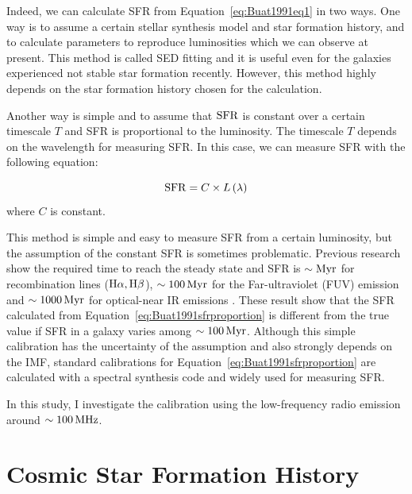 Indeed, we can calculate SFR from Equation~\ref{eq:Buat1991eq1} in two ways.
One way is to assume a certain stellar synthesis model and star formation history, and to calculate parameters to reproduce luminosities which we can observe at present.
This method is called SED fitting and it is useful even for the galaxies experienced not stable star formation recently.
However, this method highly depends on the star formation history chosen for the calculation.

Another way is simple and to assume that $\mathrm{SFR}$ is constant over a certain timescale $T$ and SFR is proportional to the luminosity.
The timescale $T$ depends on the wavelength for measuring SFR\@.
In this case, we can measure SFR with the following equation:

\begin{equation}\label{eq:Buat1991sfrproportion}
    \mathrm{SFR} = C \times L\left(\lambda\right)
\end{equation}
where $C$ is constant.

This method is simple and easy to measure SFR from a certain luminosity, but the assumption of the constant SFR is sometimes problematic.
Previous research show the required time to reach the steady state and SFR is $\sim\mathrm{Myr}$ for recombination lines ($\mathrm{H\alpha}, \mathrm{H\beta}$), $\sim 100\,\mathrm{Myr}$ for the Far-ultraviolet (FUV) emission and $\sim 1000\,\mathrm{Myr}$ for optical-near IR emissions \citep{Kennicutt1998, Kennicutt2012}.
These result show that the SFR calculated from Equation~\ref{eq:Buat1991sfrproportion} is different from the true value if SFR in a galaxy varies among $\sim 100\,\mathrm{Myr}$.
Although this simple calibration has the uncertainty of the assumption and also strongly depends on the IMF, standard calibrations for Equation~\ref{eq:Buat1991sfrproportion} are calculated with a spectral synthesis code and widely used for measuring SFR\@.


In this study, I investigate the calibration using the low-frequency radio emission around $\sim 100\,\mathrm{MHz}$.





\section{Cosmic Star Formation History}


